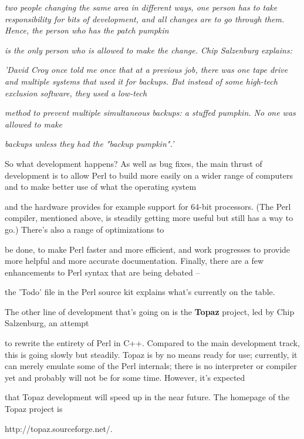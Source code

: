 \documentclass[a4paper,11pt]{book}
\begin{document}
\noindent \textit{two people changing the same area in different ways, one person has to take responsibility for bits of development, and all changes are to go through them. Hence, the person who has the patch pumpkin}

\noindent \textit{is the only person who is allowed to make the change. Chip Salzenburg explains:}

\noindent \textit{'David Croy once told me once that at a previous job, there was one tape drive and multiple systems that used it for backups. But instead of some high-tech exclusion software, they used a low-tech}

\noindent \textit{method to prevent multiple simultaneous backups: a stuffed pumpkin. No one was allowed to make}

\noindent \textit{backups unless they had the "backup pumpkin".'}

\noindent 

\noindent So what development happens? As well as bug fixes, the main thrust of development is to allow Perl to build more easily on a wider range of computers and to make better use of what the operating system

\noindent and the hardware provides for example support for 64-bit processors. (The Perl compiler, mentioned above, is steadily getting more useful but still has a way to go.) There's also a range of optimizations to

\noindent be done, to make Perl faster and more efficient, and work progresses to provide more helpful and more accurate documentation. Finally, there are a few enhancements to Perl syntax that are being debated --

\noindent the 'Todo' file in the Perl source kit explains what's currently on the table.

\noindent 

\noindent The other line of development that's going on is the \textbf{Topaz }project, led by Chip Salzenburg, an attempt

\noindent to rewrite the entirety of Perl in C++. Compared to the main development track, this is going slowly but steadily. Topaz is by no means ready for use; currently, it can merely emulate some of the Perl internals; there is no interpreter or compiler yet and probably will not be for some time. However, it's expected

\noindent that Topaz development will speed up in the near future. The homepage of the Topaz project is

\noindent http://topaz.sourceforge.net/.
\end{document}
